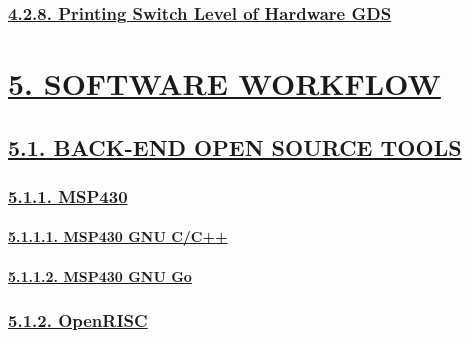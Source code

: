 \documentclass[
]{article}
\begin{document}
\hypertarget{printing-switch-level-of-hardware-gds}{%
\subsubsection{\texorpdfstring{\protect\hyperlink{printing-switch-level-of-hardware-gds-1}{4.2.8.
Printing Switch Level of Hardware
GDS}}{4.2.8. Printing Switch Level of Hardware GDS}}\label{printing-switch-level-of-hardware-gds}}

\hypertarget{software-workflow}{%
\section{\texorpdfstring{\protect\hyperlink{software-workflow-1}{5.
SOFTWARE WORKFLOW}}{5. SOFTWARE WORKFLOW}}\label{software-workflow}}

\hypertarget{back-end-open-source-tools-1}{%
\subsection{\texorpdfstring{\protect\hyperlink{back-end-open-source-tools-3}{5.1.
BACK-END OPEN SOURCE
TOOLS}}{5.1. BACK-END OPEN SOURCE TOOLS}}\label{back-end-open-source-tools-1}}

\hypertarget{msp430-1}{%
\subsubsection{\texorpdfstring{\protect\hyperlink{msp430-4}{5.1.1.
MSP430}}{5.1.1. MSP430}}\label{msp430-1}}

\hypertarget{msp430-gnu-cc}{%
\paragraph{\texorpdfstring{\protect\hyperlink{msp430-gnu-cc-1}{5.1.1.1.
MSP430 GNU C/C++}}{5.1.1.1. MSP430 GNU C/C++}}\label{msp430-gnu-cc}}

\hypertarget{msp430-gnu-go}{%
\paragraph{\texorpdfstring{\protect\hyperlink{msp430-gnu-go-1}{5.1.1.2.
MSP430 GNU Go}}{5.1.1.2. MSP430 GNU Go}}\label{msp430-gnu-go}}

\hypertarget{openrisc-1}{%
\subsubsection{\texorpdfstring{\protect\hyperlink{openrisc-4}{5.1.2.
OpenRISC}}{5.1.2. OpenRISC}}\label{openrisc-1}}
\end{document}
